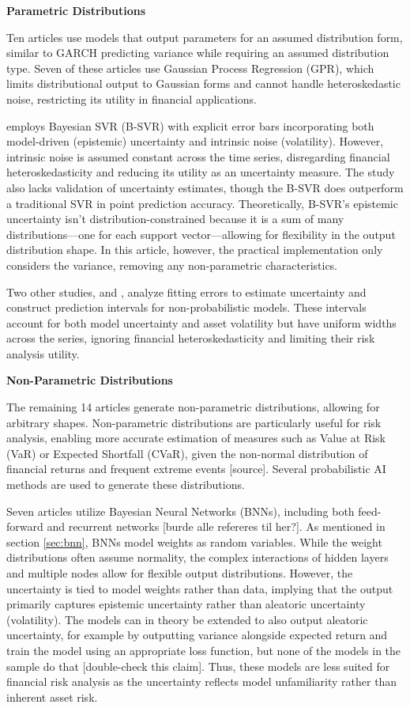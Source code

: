 \textbf{Parametric Distributions}

Ten articles use models that output parameters for an assumed distribution form, similar to GARCH predicting variance while requiring an assumed distribution type. Seven of these articles use Gaussian Process Regression (GPR), which limits distributional output to Gaussian forms and cannot handle heteroskedastic noise, restricting its utility in financial applications.

\textcite{Law2017Practical} employs Bayesian SVR (B-SVR) with explicit error bars incorporating both model-driven (epistemic) uncertainty and intrinsic noise (volatility). However, intrinsic noise is assumed constant across the time series, disregarding financial heteroskedasticity and reducing its utility as an uncertainty measure. The study also lacks validation of uncertainty estimates, though the B-SVR does outperform a traditional SVR in point prediction accuracy. Theoretically, B-SVR's epistemic uncertainty isn't distribution-constrained because it is a sum of many distributions—one for each support vector—allowing for flexibility in the output distribution shape. In this article, however, the practical implementation only considers the variance, removing any non-parametric characteristics.

Two other studies, \textcite{Guo2022} and \textcite{Tian2023}, analyze fitting errors to estimate uncertainty and construct prediction intervals for non-probabilistic models. These intervals account for both model uncertainty and asset volatility but have uniform widths across the series, ignoring financial heteroskedasticity and limiting their risk analysis utility.

\textbf{Non-Parametric Distributions}

The remaining 14 articles generate non-parametric distributions, allowing for arbitrary shapes. Non-parametric distributions are particularly useful for risk analysis, enabling more accurate estimation of measures such as Value at Risk (VaR) or Expected Shortfall (CVaR), given the non-normal distribution of financial returns and frequent extreme events [source]. Several probabilistic AI methods are used to generate these distributions.

Seven articles utilize Bayesian Neural Networks (BNNs), including both feed-forward and recurrent networks [burde alle refereres til her?]. As mentioned in section \ref{sec:bnn}, BNNs model weights as random variables. While the weight distributions often assume normality, the complex interactions of hidden layers and multiple nodes allow for flexible output distributions. However, the uncertainty is tied to model weights rather than data, implying that the output primarily captures epistemic uncertainty rather than aleatoric uncertainty (volatility). The models can in theory be extended to also output aleatoric uncertainty, for example by outputting variance alongside expected return and train the model using an appropriate loss function, but none of the models in the sample do that [double-check this claim]. Thus, these models are less suited for financial risk analysis as the uncertainty reflects model unfamiliarity rather than inherent asset risk.

